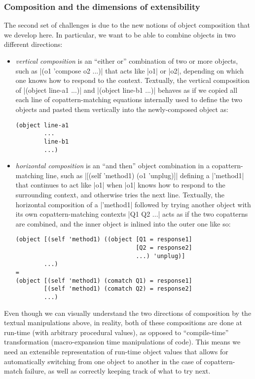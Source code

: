 \subsubsection{Composition and the dimensions of extensibility}
\label{sec:composition-challenges}

The second set of challenges is due to the new notions of object composition that we develop here.
In particular, we want to be able to combine objects in two different directions:
\begin{itemize}
\item
  \emph{vertical composition} is an ``either or'' combination of two or more objects, such as \scm|(o1 'compose o2 ...)| that acts like \scm|o1| or \scm|o2|, \etc[,] depending on which one knows how to respond to the context.
  Textually, the vertical composition of \scm|(object line-a1 ...)| and \scm|(object line-b1 ...)| behaves as if we copied all each line of copattern-matching equations internally used to define the two objects and pasted them vertically into the newly-composed object as:
\begin{lstlisting}[language=Scm]
(object line-a1
        ...
        line-b1
        ...)
\end{lstlisting}
\item
  \emph{horizontal composition} is an ``and then'' object combination in a copattern-matching line, such as \scm|[(self 'method1) (o1 'unplug)]| defining a \scm|'method1| that continues to act like \scm|o1| when \scm|o1| knows how to respond to the surrounding context, and otherwise tries the next line.
  Textually, the horizontal composition of a \scm|'method1| followed by trying another object with its own copattern-matching contexts \scm|Q1 Q2 ...| acts as if the two copatterns are combined, and the inner object is inlined into the outer one like so:
\begin{lstlisting}[language=Scm]
(object [(self 'method1) ((object [Q1 = response1]
                                  [Q2 = response2]
                                  ...) 'unplug)]
        ...)
=
(object [(self 'method1) (comatch Q1) = response1]
        [(self 'method1) (comatch Q2) = response2]
        ...)
\end{lstlisting}
\end{itemize}

Even though we can visually understand the two directions of composition by the textual manipulations above, in reality, both of these compositions are done at run-time (\ie with arbitrary procedural values), as opposed to ``compile-time'' transformation (\ie macro-expansion time manipulations of code).
This means we need an extensible representation of run-time object values that allows for automatically switching from one object to another in the case of copattern-match failure, as well as correctly keeping track of what to try next.


